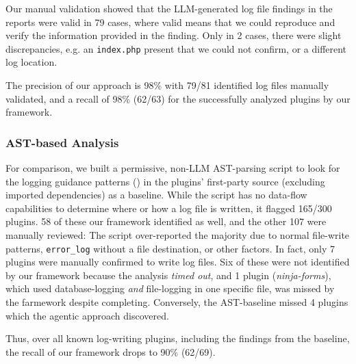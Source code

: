 \documentclass[sigconf]{acmart}
\begin{document}
Our manual validation showed that the LLM-generated log file findings in the reports were valid in 79 cases, where valid means that we could reproduce and verify the information provided in the finding. 
Only in 2 cases, there were slight discrepancies, e.g. an \texttt{index.php} present that we could not confirm, or a different log location. 

The precision of our approach is 98\% with 79/81 identified log files manually validated, and a recall of 98\% (62/63) for the successfully analyzed plugins by our framework.

\subsubsection{AST-based Analysis}
For comparison, we built a permissive, non-LLM AST-parsing script to look for the logging guidance patterns () in the plugins' first-party source (excluding imported dependencies) as a baseline. While the script has no data-flow capabilities to determine where or how a log file is written, it flagged 165/300 plugins. 58 of these our framework identified as well, and the other 107 were manually reviewed: The script over-reported the majority due to normal file-write patterns, \texttt{error\_log} without a file destination, or other factors. In fact, only 7 plugins were manually confirmed to write log files. Six of these were not identified by our framework because the analysis \emph{timed out}, and 1 plugin (\emph{ninja-forms}), which used database-logging \emph{and} file-logging in one specific file, was missed by the farmework despite completing.
Conversely, the AST-baseline missed 4 plugins which the agentic approach discovered. 

Thus, over all known log-writing plugins, including the findings from the baseline, the recall of our framework drops to 90\% (62/69).


\end{document}
